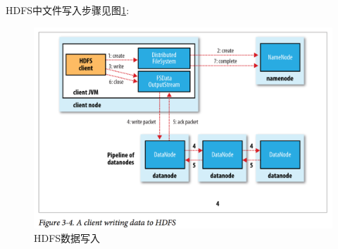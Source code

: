 \documentclass{article}
\begin{document}

HDFS中文件写入步骤见图\ref{fig:hdfs-write-data}:

\begin{figure}
\centering
\includegraphics[scale=0.5]{image/hdfs-write-data.png}
\caption{HDFS数据写入}\label{fig:hdfs-write-data}
\end{figure}


\newpage
\renewcommand\refname{参考文献}


\newpage
\renewcommand\indexname{索引}
\printindex
\end{document}
